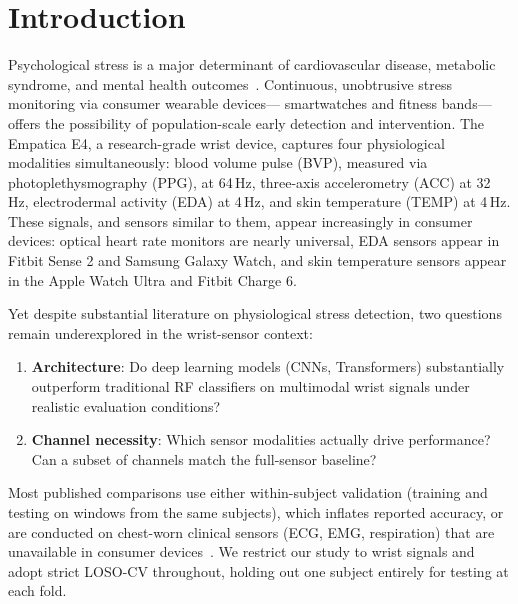 \documentclass[10pt,twocolumn]{article}
\begin{document}
\section{Introduction}
\label{sec:intro}

Psychological stress is a major determinant of cardiovascular disease,
metabolic syndrome, and mental health outcomes~\cite{yaribeygi2017}.
Continuous, unobtrusive stress monitoring via consumer wearable devices---
smartwatches and fitness bands---offers the possibility of population-scale
early detection and intervention. The Empatica E4, a research-grade wrist
device, captures four physiological modalities simultaneously:
blood volume pulse (BVP), measured via photoplethysmography (PPG), at 64\,Hz,
three-axis accelerometry (ACC) at 32\,Hz,
electrodermal activity (EDA) at 4\,Hz, and skin temperature (TEMP) at 4\,Hz.
These signals, and sensors similar to them, appear increasingly in consumer
devices: optical heart rate monitors are nearly universal, EDA sensors appear
in Fitbit Sense 2 and Samsung Galaxy Watch, and skin temperature sensors
appear in the Apple Watch Ultra and Fitbit Charge 6.

Yet despite substantial literature on physiological stress detection,
two questions remain underexplored in the wrist-sensor context:

\begin{enumerate}
  \item \textbf{Architecture}: Do deep learning models (CNNs, Transformers)
  substantially outperform traditional RF classifiers on multimodal wrist signals
  under realistic evaluation conditions?

  \item \textbf{Channel necessity}: Which sensor modalities actually drive
  performance? Can a subset of channels match the full-sensor baseline?
\end{enumerate}

Most published comparisons use either within-subject validation
(training and testing on windows from the same subjects), which inflates
reported accuracy, or are conducted on chest-worn clinical sensors
(ECG, EMG, respiration) that are unavailable in consumer devices~\cite{mekruksavanich2021,cross_modality_2025}.
We restrict our study to wrist signals and adopt strict LOSO-CV throughout,
holding out one subject entirely for testing at each fold.
\end{document}
